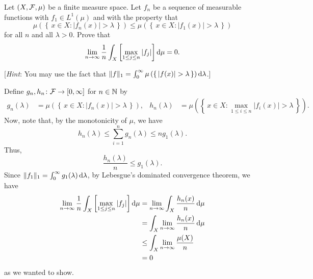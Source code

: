 \begin{problem}
  Let $(X,\mathcal{F},\mu)$ be a finite measure space. Let $f_n$ be a sequence of
  measurable functions with $f_1\in L^1(\mu)$ and with the property that
  \[
    \mu\left(\left\{\,x\in X:|f_n(x)|>\lambda\,\right\}\right) \leq
    \mu\left(\left\{\,x\in X:|f_1(x)|>\lambda\,\right\}\right)
  \]
  for all $n$ and all $\lambda>0$. Prove that
  \[
    \lim_{n\to\infty}\frac{1}{n}\int_X\left[\max_{1\leq j\leq
        n}|f_j|\right]\mathop{}\!\mathrm{d}\mu=0.
  \]

  [\emph{Hint}: You may use the fact that
  $\|f\|_1=\int_0^\infty\mu\left(\left\{\,|f(x)|>\lambda\,\right\}\right)\diff\lambda$.]
\end{problem}
\begin{solution}
  Define $g_n,h_n\colon\mathcal{F}\to[0,\infty]$ for $n\in\mathbb{N}$ by
  \begin{align*}
    g_n(\lambda)%
    &=\mu\left(\left\{\,x\in X:|f_n(x)|>\lambda\,\right\}\right),%
    &h_n(\lambda)%
    &=\mu\left(\left\{\,x\in X:\max_{1\leq i\leq n}|f_i(x)|>\lambda\,\right\}\right).%
  \end{align*}
  Now, note that, by the monotonicity of $\mu$, we have
  \[
    h_n(\lambda)\leq \sum_{i=1}^n g_n(\lambda)\leq ng_1(\lambda).
  \]
  Thus,
  \[
    \frac{h_n(\lambda)}{n}\leq g_1(\lambda).
  \]
  Since $\|f_1\|_1=\int_0^\infty g_1(\lambda)\mathop{}\!\mathrm{d}\lambda$, by Lebesgue's
  dominated convergence theorem, we have
  \begin{align*}
    \lim_{n\to\infty}\frac{1}{n}%
    \int_X\left[\max_{1\leq j\leq n}|f_j|\right]\diff\mu
    &=\lim_{n\to\infty}\int_X\frac{h_n(x)}{n}\diff\mu\\
    &=\int_X\lim_{n\to\infty}\frac{h_n(x)}{n}\diff\mu\\
    &\leq\int_X\lim_{n\to\infty}\frac{\mu(X)}{n}\\
    &=0
  \end{align*}
  as we wanted to show.
\end{solution}

